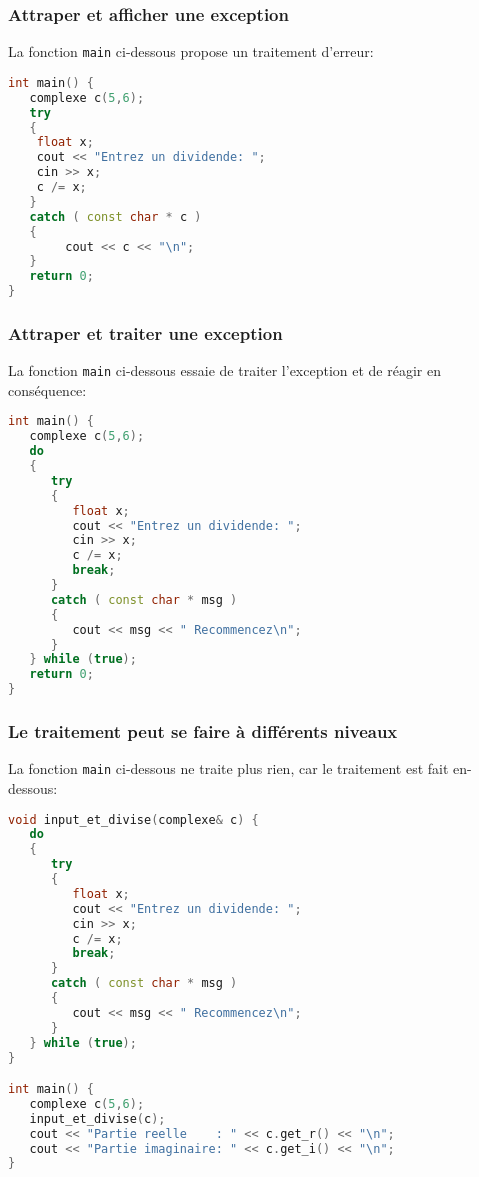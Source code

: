 \documentclass{beamer}
\begin{document}
\begin{frame}[fragile=singleslide,shrink=20]
\frametitle {Attraper et afficher une exception}

La fonction \texttt{main} ci-dessous propose un traitement d'erreur:
\begin{lstlisting}[language=c++]
int main() {
   complexe c(5,6);
   try
   {
   	float x;
   	cout << "Entrez un dividende: ";
    cin >> x;
    c /= x;
   }
   catch ( const char * c )
   {
    	cout << c << "\n";
   }
   return 0;
}
\end{lstlisting}
\end{frame}

\begin{frame}[fragile=singleslide,shrink=20]
\frametitle {Attraper et traiter une exception}

La fonction \texttt{main} ci-dessous essaie de traiter l'exception et de réagir en conséquence:
\begin{lstlisting}[language=c++]
int main() {
   complexe c(5,6);
   do
   {
      try
      {
         float x;
         cout << "Entrez un dividende: ";
         cin >> x;
         c /= x;
         break;
      }
      catch ( const char * msg )
      {
         cout << msg << " Recommencez\n";
      }
   } while (true);
   return 0;
}
\end{lstlisting}
\end{frame}

\begin{frame}[fragile=singleslide,shrink=20]
\frametitle {Le traitement peut se faire à différents niveaux}

La fonction \texttt{main} ci-dessous ne traite plus rien, car le traitement est fait en-dessous:
\begin{lstlisting}[language=c++]
void input_et_divise(complexe& c) {
   do
   {
      try
      {
         float x;
         cout << "Entrez un dividende: ";
         cin >> x;
         c /= x;
         break;
      }
      catch ( const char * msg )
      {
         cout << msg << " Recommencez\n";
      }
   } while (true);
}

int main() {
   complexe c(5,6);
   input_et_divise(c);
   cout << "Partie reelle    : " << c.get_r() << "\n";
   cout << "Partie imaginaire: " << c.get_i() << "\n";
}
\end{lstlisting}
\end{frame}
\end{document}
